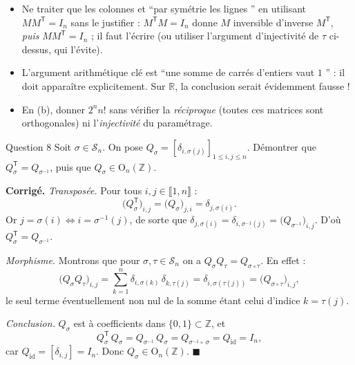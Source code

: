 \documentclass[11pt,a4paper]{article}
\newenvironment{corrige}
  {\par\medskip\noindent
   \begin{tcolorbox}[blanker, breakable,
     borderline west={2.5pt}{0pt}{vertP},
     left=10pt, top=2pt, bottom=2pt]
   {\color{vertP}\bfseries Corrigé.}\hspace{0.5em}\ignorespaces}
  {\hfill$\blacksquare$\end{tcolorbox}\medskip}
\newcommand{\og}{``}
\newcommand{\fg}{''}
\newcommand{\Z}{\mathbb{Z}}
\newcommand{\R}{\mathbb{R}}
\newcommand{\On}[1][n]{\mathrm{O}_{#1}}
\newcommand{\Perm}[1][n]{\mathcal{S}_{#1}} %
\newcommand{\ii}[2]{\llbracket #1,#2\rrbracket}
\newcommand{\T}{\mathsf{T}}               %
\begin{document}
\begin{pieges}
\begin{itemize}[leftmargin=1.4em, itemsep=2pt]
\item Ne traiter que les colonnes et \og par symétrie les lignes \fg{}
en utilisant $MM^{\T}=I_n$ sans le justifier : $M^{\T}M=I_n$ donne
$M$ inversible d'inverse $M^{\T}$, \emph{puis} $MM^{\T}=I_n$ ; il
faut l'écrire (ou utiliser l'argument d'injectivité de $\tau$
ci-dessus, qui l'évite).
\item L'argument arithmétique clé est \og une somme de carrés
d'entiers vaut $1$ \fg{} : il doit apparaître explicitement. Sur
$\R$, la conclusion serait évidemment fausse !
\item En (b), donner $2^{n}n!$ sans vérifier la \emph{réciproque}
(toutes ces matrices sont orthogonales) ni l'\emph{injectivité} du
paramétrage.
\end{itemize}
\end{pieges}

\begin{enonce}{Question 8}
Soit $\sigma\in\Perm$. On pose
$Q_\sigma=[\delta_{i,\sigma(j)}]_{1\le i,j\le n}$. Démontrer que
$Q_\sigma^{\T}=Q_{\sigma^{-1}}$, puis que $Q_\sigma\in\On(\Z)$.
\end{enonce}

\begin{corrige}
\emph{Transposée.} Pour tous $i,j\in\ii{1}{n}$ :
\[
\big(Q_\sigma^{\T}\big)_{i,j}
=\big(Q_\sigma\big)_{j,i}
=\delta_{j,\sigma(i)} .
\]
Or $j=\sigma(i)\iff i=\sigma^{-1}(j)$, de sorte que
$\delta_{j,\sigma(i)}=\delta_{i,\sigma^{-1}(j)}
=\big(Q_{\sigma^{-1}}\big)_{i,j}$. D'où
$Q_\sigma^{\T}=Q_{\sigma^{-1}}$.

\emph{Morphisme.} Montrons que pour $\sigma,\tau\in\Perm$ on a
$Q_\sigma Q_\tau=Q_{\sigma\circ\tau}$. En effet :
\[
\big(Q_\sigma Q_\tau\big)_{i,j}
=\sum_{k=1}^{n}\delta_{i,\sigma(k)}\,\delta_{k,\tau(j)}
=\delta_{i,\sigma(\tau(j))}
=\big(Q_{\sigma\circ\tau}\big)_{i,j},
\]
le seul terme éventuellement non nul de la somme étant celui d'indice
$k=\tau(j)$.

\emph{Conclusion.} $Q_\sigma$ est à coefficients dans $\{0,1\}
\subset\Z$, et
\[
Q_\sigma^{\T}\,Q_\sigma
=Q_{\sigma^{-1}}\,Q_\sigma
=Q_{\sigma^{-1}\circ\,\sigma}
=Q_{\mathrm{id}}
=I_n ,
\]
car $Q_{\mathrm{id}}=[\delta_{i,j}]=I_n$. Donc
$Q_\sigma\in\On(\Z)$.
\end{corrige}
\end{document}
